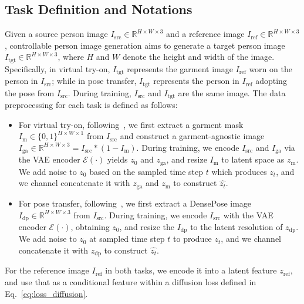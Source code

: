 \subsection{Task Definition and Notations}

\noindent Given a source person image $I_{\text{src}} \in \mathbb{R}^{H \times W \times 3}$ and a reference image $I_{\text{ref}} \in \mathbb{R}^{H \times W \times 3}$, controllable person image generation aims to generate a target person image $I_{\text{tgt}} \in \mathbb{R}^{H \times W \times 3}$, where $H$ and $W$ denote the height and width of the image.
Specifically, in virtual try-on, $I_{\text{tgt}}$ represents the garment image $I_{\text{ref}}$ worn on the person in $I_{\text{src}}$; while in pose transfer, $I_{\text{tgt}}$ represents the person in $I_{\text{ref}}$ adopting the pose from $I_{\text{src}}$.
During training, $I_{\text{src}}$ and $I_{\text{tgt}}$ are the same image.
The data preprocessing for each task is defined as follows:

\begin{itemize}
    \item For virtual try-on, following~\citep{choi2024improving, chong2024catvton}, we first extract a garment mask $I_\text{m} \in \{0, 1\}^{H \times W \times 1}$ from $I_\text{src}$ and construct a garment-agnostic image $I_\text{ga} \in \mathbb{R}^{H \times W \times 3} = I_\text{src} * (1 - I_\text{m})$.
    During training, we encode $I_\text{src}$ and $I_\text{ga}$ via the VAE encoder $\mathcal{E}(\cdot)$ yields $z_\text{0}$ and $z_\text{ga}$, and resize $I_\text{m}$ to latent space as $z_\text{m}$.
    We add noise to $z_\text{0}$ based on the sampled time step $t$ which produces $z_t$, and we channel concatenate it with $z_\text{ga}$ and $z_\text{m}$ to construct $\hat{z_t}$.
    \item For pose transfer, following~\citep{han2023controllable}, we first extract a DensePose image~\citep{guler2018densepose} $I_\text{dp} \in \mathbb{R}^{H \times W \times 3}$ from $I_\text{src}$.
    During training, we encode $I_\text{src}$ with the VAE encoder $\mathcal{E}(\cdot)$, obtaining $z_\text{0}$, and resize the $I_\text{dp}$ to the latent resolution of $z_\text{dp}$.
    We add noise to $z_\text{0}$ at sampled time step $t$ to produce $z_t$, and we channel concatenate it with $z_\text{dp}$ to construct $\hat{z_t}$.
\end{itemize}
For the reference image $I_{\text{ref}}$ in both tasks, we encode it into a latent feature $z_{\text{ref}}$, and use that as a conditional feature within a diffusion loss defined in Eq.~\ref{eq:loss_diffusion}.


